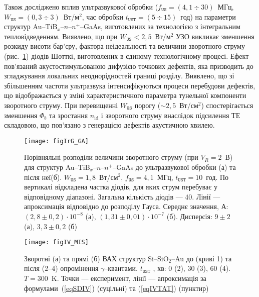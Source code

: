 Також досліджено вплив ультразвукової обробки
($f_\mathtt{US}=(4,1\div30)$~МГц, $W_\mathtt{US}=(0,3\div3)$~Вт/м$^2$, час обробки $t_\mathtt{UST}=(5\div15)$~год) на параметри структур
Au--TiB$_x$--$n$--$n^+$--GaAs, виготовлених
за технологією з інтегральним тепловідведенням.
Виявлено, що при $W_\mathtt{US}<2,5$~Вт/м$^2$ УЗО викликає зменшення розкиду висоти бар'єру, фактора неідеальності та величини зворотного струму (рис.~\ref{figIrG_GA})
діодів Шотткі, виготовлених в єдиному технологічному процесі.
Ефект пов'язаний акустостимульованою дифузією точкових дефектів, яка призводить до згладжування локальних неоднорідностей границі розділу.
Виявлено, що зі збільшенням частоти ультразвука інтенсифікуються процеси перебудови дефектів, що відображається у зміні характеристичного  параметра тунельної компоненти зворотного
струму.
При перевищенні $W_\mathtt{US}$ порогу ($\sim2,5$~Вт/см$^2$) спостерігається зменшення $\Phi_b$ та зростання $n_\mathrm{id}$ і зворотного струму внаслідок підсилення ТЕ складовою, що пов'язано з генерацією дефектів акустичною хвилею.

\begin{figure}
\center
\texttt{[image: figIrG\_GA]}%
\caption{\label{figIrG_GA}
Порівняльні розподіли величини зворотного струму (при $V_R=2$~В)
для структур Au--TiB$_x$--$n$--$n^+$--GaAs до ультразвукової обробки (а) та після неї(б).
$W_\mathtt{US}=1,8$~Вт/см$^2$, $f_\mathtt{US}=4,1$~МГц, $t_\mathtt{UST}=10$~год.
По вертикалі відкладена частка діодів, для яких струм перебуває у відповідному діапазоні.
Загальна кількість діодів --- 40.
Лінії --- апроксимація відповідно до розподілу Гауса.
Середнє значення, А:
$(2,8\pm0,2)\cdot10^{-8}$ (а),
$(1,31\pm0,01)\cdot10^{-7}$ (б).
Дисперсія:
$9\pm2$ (а),
$3,3\pm0,2$ (б)
}
\end{figure}

\begin{figure}[b]
\center
\texttt{[image: figIV\_MIS]}%
\caption{\label{figIV_MIS}
Зворотні (а) та прямі (б) ВАХ структур Si--SiO$_2$--Au до (криві 1)
та після (2--4) опромінення $\gamma$--квантами.
$t_\mathtt{UST}$ , хв: 0 (2), 30 (3), 60 (4).
$T=300$~K.
Точки --- експеримент,
лінії --- апроксимація за формулами~(\ref{eqSDIV}) (суцільні) та (\ref{eqIVTAT}) (пунктир)
}%
\end{figure}

